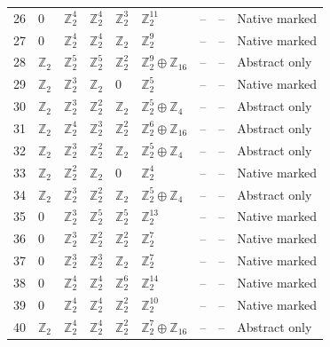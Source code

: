 \documentclass[10pt]{article}
\begin{document}
\begin{longtable}{r|lllll|rrl}
26 & $0$ & $\mathbb{Z}_{2}^{4}$ & $\mathbb{Z}_{2}^{4}$ & $\mathbb{Z}_{2}^{3}$ & $\mathbb{Z}_{2}^{11}$ & -- & -- & Native marked\\
27 & $0$ & $\mathbb{Z}_{2}^{4}$ & $\mathbb{Z}_{2}^{4}$ & $\mathbb{Z}_{2}$ & $\mathbb{Z}_{2}^{9}$ & -- & -- & Native marked\\
28 & $\mathbb{Z}_{2}$ & $\mathbb{Z}_{2}^{5}$ & $\mathbb{Z}_{2}^{5}$ & $\mathbb{Z}_{2}^{2}$ & $\mathbb{Z}_{2}^{9}\oplus \mathbb{Z}_{16}$ & -- & -- & Abstract only\\
29 & $\mathbb{Z}_{2}$ & $\mathbb{Z}_{2}^{3}$ & $\mathbb{Z}_{2}$ & $0$ & $\mathbb{Z}_{2}^{5}$ & -- & -- & Native marked\\
30 & $\mathbb{Z}_{2}$ & $\mathbb{Z}_{2}^{3}$ & $\mathbb{Z}_{2}^{2}$ & $\mathbb{Z}_{2}$ & $\mathbb{Z}_{2}^{5}\oplus \mathbb{Z}_{4}$ & -- & -- & Abstract only\\
31 & $\mathbb{Z}_{2}$ & $\mathbb{Z}_{2}^{4}$ & $\mathbb{Z}_{2}^{3}$ & $\mathbb{Z}_{2}^{2}$ & $\mathbb{Z}_{2}^{6}\oplus \mathbb{Z}_{16}$ & -- & -- & Abstract only\\
32 & $\mathbb{Z}_{2}$ & $\mathbb{Z}_{2}^{3}$ & $\mathbb{Z}_{2}^{2}$ & $\mathbb{Z}_{2}$ & $\mathbb{Z}_{2}^{5}\oplus \mathbb{Z}_{4}$ & -- & -- & Abstract only\\
33 & $\mathbb{Z}_{2}$ & $\mathbb{Z}_{2}^{2}$ & $\mathbb{Z}_{2}$ & $0$ & $\mathbb{Z}_{2}^{4}$ & -- & -- & Native marked\\
34 & $\mathbb{Z}_{2}$ & $\mathbb{Z}_{2}^{3}$ & $\mathbb{Z}_{2}^{2}$ & $\mathbb{Z}_{2}$ & $\mathbb{Z}_{2}^{5}\oplus \mathbb{Z}_{4}$ & -- & -- & Abstract only\\
35 & $0$ & $\mathbb{Z}_{2}^{3}$ & $\mathbb{Z}_{2}^{5}$ & $\mathbb{Z}_{2}^{5}$ & $\mathbb{Z}_{2}^{13}$ & -- & -- & Native marked\\
36 & $0$ & $\mathbb{Z}_{2}^{3}$ & $\mathbb{Z}_{2}^{2}$ & $\mathbb{Z}_{2}^{2}$ & $\mathbb{Z}_{2}^{7}$ & -- & -- & Native marked\\
37 & $0$ & $\mathbb{Z}_{2}^{3}$ & $\mathbb{Z}_{2}^{3}$ & $\mathbb{Z}_{2}$ & $\mathbb{Z}_{2}^{7}$ & -- & -- & Native marked\\
38 & $0$ & $\mathbb{Z}_{2}^{4}$ & $\mathbb{Z}_{2}^{4}$ & $\mathbb{Z}_{2}^{6}$ & $\mathbb{Z}_{2}^{14}$ & -- & -- & Native marked\\
39 & $0$ & $\mathbb{Z}_{2}^{4}$ & $\mathbb{Z}_{2}^{4}$ & $\mathbb{Z}_{2}^{2}$ & $\mathbb{Z}_{2}^{10}$ & -- & -- & Native marked\\
40 & $\mathbb{Z}_{2}$ & $\mathbb{Z}_{2}^{4}$ & $\mathbb{Z}_{2}^{4}$ & $\mathbb{Z}_{2}^{2}$ & $\mathbb{Z}_{2}^{7}\oplus \mathbb{Z}_{16}$ & -- & -- & Abstract only\\

\end{longtable}
\end{document}
